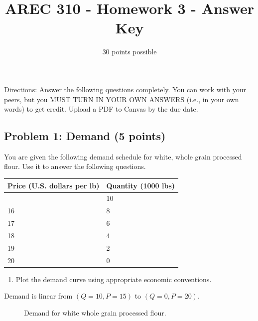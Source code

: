\documentclass[
  letterpaper,
  DIV=11,
  numbers=noendperiod]{scrartcl}
\title{AREC 310 - Homework 3 - Answer Key}
\subtitle{30 points possible}
\author{}
\date{}
\providecommand{\tightlist}{%
  \setlength{\itemsep}{0pt}\setlength{\parskip}{0pt}}
\begin{document}
\maketitle


Directions: Answer the following questions completely. You can work with
your peers, but you MUST TURN IN YOUR OWN ANSWERS (i.e., in your own
words) to get credit. Upload a PDF to Canvas by the due date.

\subsection{Problem 1: Demand (5
points)}\label{problem-1-demand-5-points}

You are given the following demand schedule for white, whole grain
processed flour. Use it to answer the following questions.

\begin{longtable}[]{@{}ll@{}}
\toprule\noalign{}
Price (U.S. dollars per lb) & Quantity (1000 lbs) \\
\midrule\noalign{}
\endhead
\bottomrule\noalign{}
\endlastfoot
15 & 10 \\
16 & 8 \\
17 & 6 \\
18 & 4 \\
19 & 2 \\
20 & 0 \\
\end{longtable}

\begin{enumerate}
\def\labelenumi{\alph{enumi}.}
\tightlist
\item
  Plot the demand curve using appropriate economic conventions.
\end{enumerate}

Demand is linear from \((Q=10, P=15)\) to \((Q=0, P=20)\).

\begin{figure}[h]
\centering
{}
\caption{Demand for white whole grain processed flour.}
\end{figure}
\end{document}
